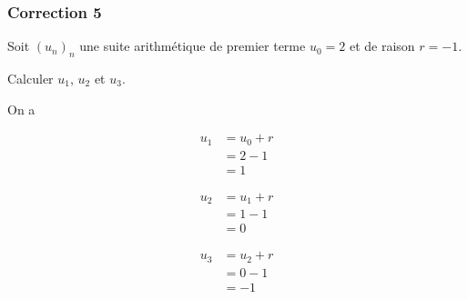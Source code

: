 \documentclass[15pt, mathserif]{beamer}
\begin{document}
\begin{frame}
\vspace{-10mm}
	\frametitle{Correction 5}
Soit $(u_n)_n$ une suite arithmétique de premier terme $u_0=2$ et de raison $r=-1$. 
 
 Calculer $u_1$, $u_2$ et $u_3$. 
 
 On a 
 \begin{minipage}{0.25\textwidth} 
 
 \begin{align*} 
 u_1 &= u_0+r \\ &= 2-1 \\ &=1
 \end{align*} 
  
 \end{minipage} \hfil \begin{minipage}{0.25\textwidth} 
 
 \begin{align*} 
 u_2 &= u_1+r \\ &= 1-1 \\ &=0
 \end{align*} 
 
 \end{minipage} \hfil \begin{minipage}{0.25\textwidth} 
 
 \begin{align*} 
 u_3 &= u_2+r \\ &= 0-1 \\ &=-1
 \end{align*} 
 
 \end{minipage} 
\end{frame}
\end{document}
